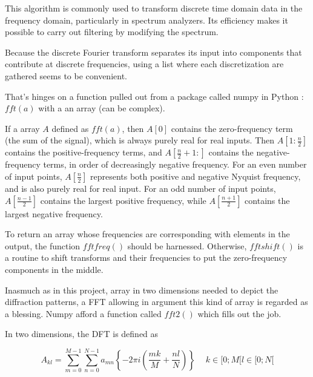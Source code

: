\documentclass[10pt,a4paper]{article}
\begin{document}
This algorithm is commonly used to transform discrete time domain data in the frequency domain, particularly in spectrum analyzers. Its efficiency makes it possible to carry out filtering by modifying the spectrum.  

Because the discrete Fourier transform separates its input into components that contribute at discrete frequencies, using a list where each discretization are gathered seems to be convenient. 

That's hinges on a function pulled out from a package called numpy in Python : $fft(a)$ with a an array (can be complex). 

If a array $A$ defined as $fft(a)$, then $A[0]$ contains the zero-frequency term (the sum of the signal), which is always purely real for real inputs. Then $A\left[1:\frac{n}{2}\right]$ contains the positive-frequency terms, and $A\left[\frac{n}{2}+1:\right]$ contains the negative-frequency terms, in order of decreasingly negative frequency. For an even number of input points, $A\left[\frac{n}{2}\right]$ represents both positive and negative Nyquist frequency, and is also purely real for real input. For an odd number of input points, $A\left[\frac{n-1}{2}\right]$ contains the largest positive frequency, while $A\left[\frac{n+1}{2}\right]$ contains the largest negative frequency. 

To return an array whose frequencies are corresponding with elements in the output, the function $fftfreq()$ should be harnessed. Otherwise, $fftshift()$ is a routine to shift transforms and their frequencies to put the zero-frequency components in the middle. 

Inasmuch as in this project, array in two dimensions needed to depict the diffraction patterns, a FFT allowing in argument this kind of array is regarded as a blessing. Numpy afford a function called $fft2()$ which fills out the job.  

In two dimensions, the DFT is defined as 

\[A_{kl}=\sum_{m=0}^{M-1}\sum_{n=0}^{N-1}a_{mn}\left\lbrace-2\pi i\left(\frac{mk}{M}+\frac{nl}{N}\right)\right\rbrace\
\quad
k\in[0;M[l\in[0;N[\]
\end{document}
